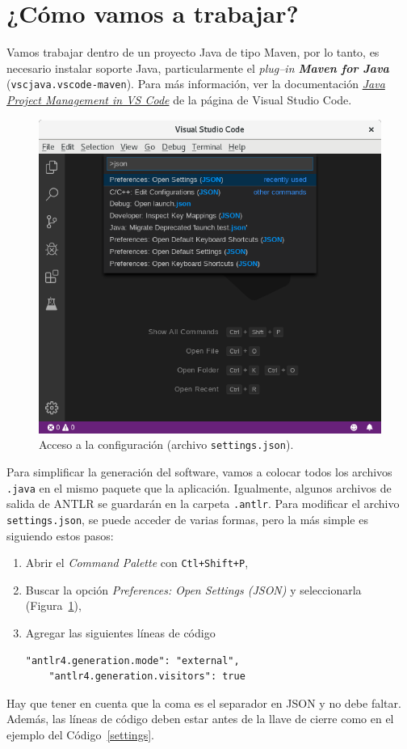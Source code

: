 \documentclass[a5paper,10pt]{article}
\begin{document}
\section{¿Cómo vamos a trabajar?}

Vamos trabajar dentro de un proyecto Java de tipo Maven, por lo tanto, es necesario instalar soporte Java, particularmente el \emph{plug--in \textbf{Maven for Java}} (\verb|vscjava.vscode-maven|).  Para más información, ver la documentación \href{https://code.visualstudio.com/docs/java/java-project}{\emph{Java Project Management in VS Code}} de la página de Visual Studio Code.

\begin{figure}[p]
	\centering
	\includegraphics[width=.95\textwidth]{img/SelectJSON}
	\caption{Acceso a la configuración (archivo \texttt{settings.json}).}
	\label{preferences}
\end{figure}

Para simplificar la generación del software, vamos a colocar todos los archivos \verb|.java| en el mismo paquete que la aplicación.  Igualmente, algunos archivos de salida de ANTLR se guardarán en la carpeta \verb|.antlr|.  Para modificar el archivo \verb|settings.json|, se puede acceder de varias formas, pero la más simple es siguiendo estos pasos:
\begin{enumerate}
	\item Abrir el \emph{Command Palette} con \verb|Ctl+Shift+P|,
	\item Buscar la opción \emph{Preferences: Open Settings (JSON)} y seleccionarla (Figura~\ref{preferences}),
	\item Agregar las siguientes líneas de código
	\begin{lstlisting}[style=miJSON]
	"antlr4.generation.mode": "external",
	"antlr4.generation.visitors": true
	\end{lstlisting}
\end{enumerate}
Hay que tener en cuenta que la coma es el separador en JSON y no debe faltar.  Además, las líneas de código deben estar antes de la llave de cierre como en el ejemplo del Código~\ref{settings}.
\end{document}
